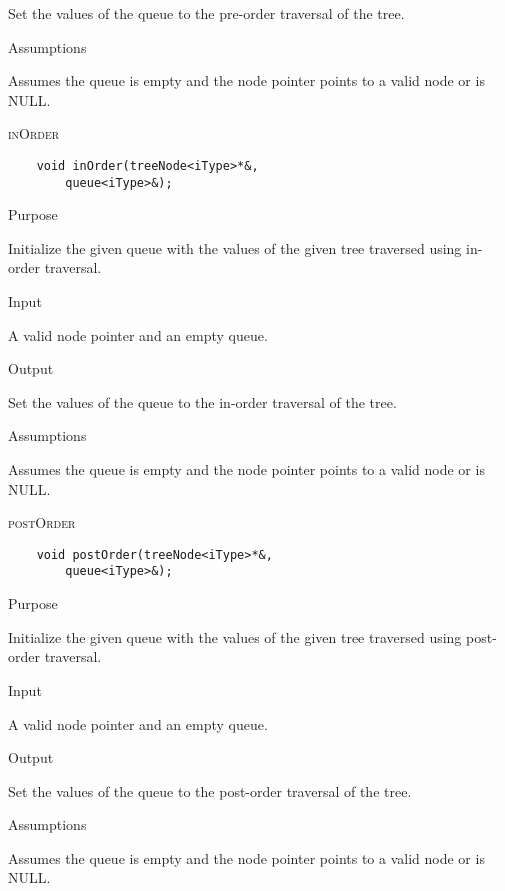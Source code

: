 \documentclass[pdftex, 12pt]{article}
\begin{document}
\begin{description}
\begin{description}
				Set the values of the queue to the pre-order traversal of the tree.

			\item{Assumptions}

				Assumes the queue is empty and the node pointer points to a valid node or is NULL.

		\end{description}
	\item{\textsc{inOrder}}
\begin{lstlisting}
	void inOrder(treeNode<iType>*&, 
		queue<iType>&);
\end{lstlisting}
		\begin{description}

		\item{Purpose}
			
			Initialize the given queue with the values of the given tree traversed using in-order traversal.

		\item{Input}

			A valid node pointer and an empty queue.

		\item{Output}

			Set the values of the queue to the in-order traversal of the tree.

		\item{Assumptions}

			Assumes the queue is empty and the node pointer points to a valid node or is NULL.

		\end{description}
	\item{\textsc{postOrder}}
\begin{lstlisting}
	void postOrder(treeNode<iType>*&, 
		queue<iType>&);
\end{lstlisting}
		\begin{description}

		\item{Purpose}
			
			Initialize the given queue with the values of the given tree traversed using post-order traversal.

		\item{Input}

			A valid node pointer and an empty queue.

		\item{Output}

			Set the values of the queue to the post-order traversal of the tree.

		\item{Assumptions}

			Assumes the queue is empty and the node pointer points to a valid node or is NULL.

		\end{description}

\end{description}
\end{document}
